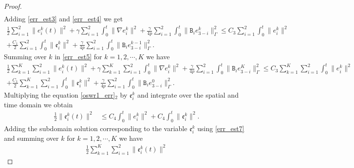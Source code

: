 \documentclass[10pt,a4paper]{amsart}
\begin{document}
\begin{proof}
\begin{equation}
\begin{aligned}
\end{aligned}
\end{equation} 
Adding \eqref{err_est3} and \eqref{err_est4} we get
\begin{equation}\label{err_est5}
\begin{aligned}
\frac{1}{2}\sum_{i=1}^2\parallel e_i^{k}(t)\parallel^2 + \gamma \sum_{i=1}^2\int_0^t\parallel\nabla e_i^{k} \parallel^2 +\frac{\gamma}{4p} \sum_{i=1}^2\int_0^t\parallel\mathtt{B}_i e_{3-i}^{k}\parallel_{\Gamma}^2
 \leq C_3 \sum_{i=1}^2\int_0^t\parallel e_i^{k}\parallel^2 \\
 + \frac{C_1}{2} \sum_{i=1}^2\int_0^t\parallel \mathfrak{e}_i^{k}\parallel^2
+\frac{\gamma}{4p}\sum_{i=1}^2\int_0^t\parallel\mathtt{B}_i e_{3-i}^{k-1}\parallel_{\Gamma}^2.
\end{aligned}
\end{equation} 
Summing over $k$ in \eqref{err_est5} for $k=1,2,\cdots, K$ we have 
\begin{equation}\label{err_est6}
\begin{aligned}
\frac{1}{2}\sum_{k=1}^K\sum_{i=1}^2\parallel e_i^{k}(t)\parallel^2 + \gamma\sum_{k=1}^K\sum_{i=1}^2\int_0^t \parallel\nabla e_i^{k} \parallel^2 +\frac{\gamma}{4p} \sum_{i=1}^2\int_0^t\parallel\mathtt{B}_i e_{3-i}^{K}\parallel_{\Gamma}^2
 \leq C_3 \sum_{k=1}^K\sum_{i=1}^2\int_0^t\parallel e_i^{k}\parallel^2 \\
 + \frac{C_1}{2} \sum_{k=1}^K\sum_{i=1}^2\int_0^t\parallel \mathfrak{e}_i^{k}\parallel^2
+\frac{\gamma}{4p}\sum_{i=1}^2\int_0^t\parallel\mathtt{B}_i e_{3-i}^{0}\parallel_{\Gamma}^2.
\end{aligned}
\end{equation} 
Multiplying the equation \eqref{oswr1_err}$_2$ by $\mathfrak{e}_i^{k}$ and integrate over the spatial and time domain we obtain 
\begin{equation}\label{err_est7}
\begin{aligned}
\frac{1}{2}\parallel \mathfrak{e}_i^{k}(t)\parallel^2 
& \leq C_4 \int_0^t\parallel e_i^{k}\parallel^2 + C_4 \int_0^t\parallel \mathfrak{e}_i^{k}\parallel^2.
\end{aligned}
\end{equation} 
Adding the subdomain solution corresponding to the variable $\mathfrak{e}_i^{k}$ using \eqref{err_est7} and summing over $k$ for $k=1, 2, \cdots, K$ we have 
\begin{equation}\label{err_est8}
\begin{aligned}
\frac{1}{2}\sum_{k=1}^K\sum_{i=1}^2\parallel \mathfrak{e}_i^{k}(t)\parallel^2 

\end{aligned}
\end{equation}
\end{proof}
\end{document}
